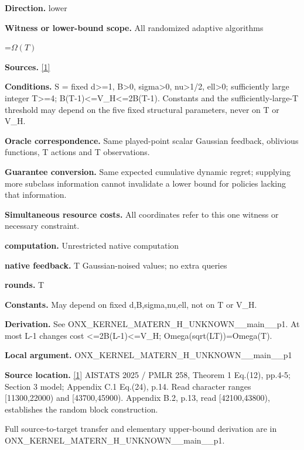 \documentclass[10pt,a4paper]{article}
\newcommand{\AtlasMath}[1]{\par\begingroup\centering\setbox0=\hbox{$\displaystyle #1$}\ifdim\wd0>1.4\linewidth\typeout{ATLAS WIDE FORMULA: \the\wd0}\fi\ifdim\wd0>\linewidth\resizebox{\linewidth}{!}{\box0}\else\box0\fi\par\endgroup}
\begin{document}
\textbf{Direction.} lower

\textbf{Witness or lower-bound scope.} All randomized adaptive algorithms

\AtlasMath{\Omega(T)}
\textbf{Sources.} \href{https://raw.githubusercontent.com/mlresearch/v258/main/assets/cai25a/cai25a.pdf}{[1]}

\textbf{Conditions.} S = fixed d>=1, B>0, sigma>0, nu>1/2, ell>0; sufficiently large integer T>=4; B(T-1)<=V\_\allowbreak{}H<=2B(T-1). Constants and the sufficiently-large-T threshold may depend on the five fixed structural parameters, never on T or V\_\allowbreak{}H.

\textbf{Oracle correspondence.} Same played-point scalar Gaussian feedback, oblivious functions, T actions and T observations.

\textbf{Guarantee conversion.} Same expected cumulative dynamic regret; supplying more subclass information cannot invalidate a lower bound for policies lacking that information.

\textbf{Simultaneous resource costs.} All coordinates refer to this one witness or necessary constraint.

\textbf{computation.} Unrestricted native computation

\textbf{native feedback.} T Gaussian-noised values; no extra queries

\textbf{rounds.} T

\textbf{Constants.} May depend on fixed d,B,sigma,nu,ell, not on T or V\_\allowbreak{}H.

\textbf{Derivation.} See ONX\_\allowbreak{}KERNEL\_\allowbreak{}MATERN\_\allowbreak{}H\_\allowbreak{}UNKNOWN\_\allowbreak{}\_\allowbreak{}main\_\allowbreak{}\_\allowbreak{}p1. At most L-1 changes cost <=2B(L-1)<=V\_\allowbreak{}H; Omega(sqrt(LT))=Omega(T).

\textbf{Local argument.} ONX\_\allowbreak{}KERNEL\_\allowbreak{}MATERN\_\allowbreak{}H\_\allowbreak{}UNKNOWN\_\allowbreak{}\_\allowbreak{}main\_\allowbreak{}\_\allowbreak{}p1

\textbf{Source location.} \href{https://raw.githubusercontent.com/mlresearch/v258/main/assets/cai25a/cai25a.pdf}{[1]} AISTATS 2025 / PMLR 258, Theorem 1 Eq.(12), pp.4-5; Section 3 model; Appendix C.1 Eq.(24), p.14. Read character ranges [11300,22000) and [43700,45900). Appendix B.2, p.13, read [42100,43800), establishes the random block construction.

Full source-to-target transfer and elementary upper-bound derivation are in ONX\_\allowbreak{}KERNEL\_\allowbreak{}MATERN\_\allowbreak{}H\_\allowbreak{}UNKNOWN\_\allowbreak{}\_\allowbreak{}main\_\allowbreak{}\_\allowbreak{}p1.
\end{document}
